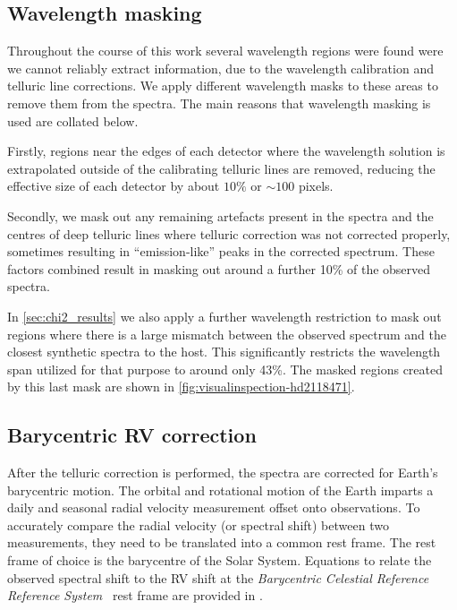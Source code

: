 \subsection{Wavelength masking}
Throughout the course of this work several wavelength regions were found were we cannot reliably extract information, due to the wavelength calibration and telluric line corrections.
We apply different wavelength masks to these areas to remove them from the spectra.
The main reasons that wavelength masking is used are collated below.

Firstly, regions near the edges of each detector where the wavelength solution is extrapolated outside of the calibrating telluric lines are removed, reducing the effective size of each detector by about \(10\%\) or \(\sim100\) pixels.

Secondly, we mask out any remaining artefacts present in the spectra and the centres of deep telluric lines where telluric correction was not corrected properly, sometimes resulting in ``emission-like'' peaks in the corrected spectrum.
These factors combined result in masking out around a further 10\% of the observed spectra.

In \cref{sec:chi2_results} we also apply a further wavelength restriction to mask out regions where there is a large mismatch between the observed spectrum and the closest synthetic spectra to the host.
This significantly restricts the wavelength span utilized for that purpose to around only 43\%.
The masked regions created by this last mask are shown in \cref{fig:visualinspection-hd2118471}.




\subsection{Barycentric RV correction}
\label{{subsec:barycentriccorrection}}
After the telluric correction is performed, the spectra are corrected for Earth's barycentric motion. The orbital and rotational motion of the Earth imparts a daily and seasonal radial velocity measurement offset onto observations. To accurately compare the radial velocity (or spectral shift) between two measurements, they need to be translated into a common rest frame. The rest frame of choice is the barycentre of the Solar System.  Equations to relate the observed spectral shift to the RV shift at the \textit{Barycentric Celestial Reference Reference System}~\citep{rickman_transactions_2001} rest frame are provided in \citep{lindegren_fundamental_2003}.

